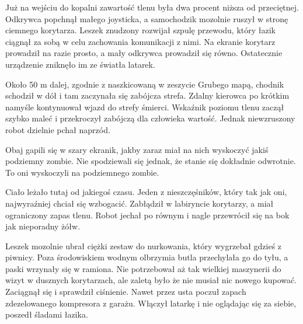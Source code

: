 Już na wejściu do kopalni zawartość tlenu była dwa procent niższa od przeciętnej.
Odkrywca popchnął małego joysticka, a samochodzik mozolnie ruszył w stronę ciemnego korytarza.
Leszek znudzony rozwijał szpulę przewodu, który łazik ciągnął za sobą w celu zachowania komunikacji z nimi.
Na ekranie korytarz prowadził na razie prosto, a mały odkrywca prowadził się równo. Ostatecznie urządzenie zniknęło im ze światła latarek.

Około 50 m dalej, zgodnie z naszkicowaną w zeszycie Grubego mapą, chodnik schodził w dół i tam zaczynała się zabójcza strefa.
Zdalny kierowca po krótkim namyśle kontynuował wjazd do strefy śmierci. Wskaźnik poziomu tlenu zaczął szybko maleć i przekroczył zabójczą dla człowieka wartość.
Jednak niewzruszony robot dzielnie pchał naprzód.

Obaj gapili się w szary ekranik, jakby zaraz miał na nich wyskoczyć jakiś podziemny zombie.
Nie spodziewali się jednak, że stanie się dokładnie odwrotnie. To oni wyskoczyli na podziemnego zombie.

Ciało leżało tutaj od jakiegoś czasu. Jeden z nieszczęśników, który tak jak oni, najwyraźniej chciał się wzbogacić.
Zabłądził w labiryncie korytarzy, a miał ograniczony zapas tlenu.
Robot jechał po równym i nagle przewrócił się na bok jak nieporadny żółw.

Leszek mozolnie ubrał ciężki zestaw do nurkowania, który wygrzebał gdzieś z piwnicy.
Poza środowiskiem wodnym olbrzymia butla przechylała go do tyłu, a paski wrzynały się w ramiona.
Nie potrzebował aż tak wielkiej maszynerii do wizyt w dusznych korytarzach, ale zaletą było że nie musiał nic nowego kupować.
Zaciągnął się i sprawdził ciśnienie. Nawet przez usta poczuł zapach zdezelowanego kompresora z garażu.
Włączył latarkę i nie oglądając się za siebie, poszedł śladami łazika.

